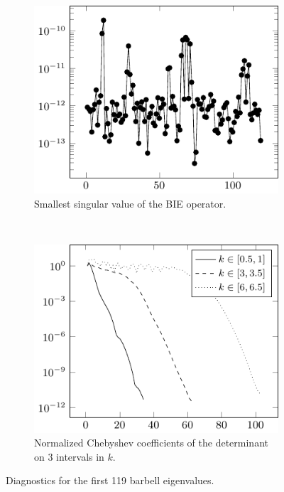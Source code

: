 \begin{figure}
  \centering
  \begin{subfigure}[t]{0.4\textwidth}
    \centering
    \includegraphics[width=\textwidth]{ex_barbell_001_sings_plot}
    \caption{Smallest singular value of the BIE operator.}
    \label{subfig:barbell_sings}
  \end{subfigure}
  ~
  \begin{subfigure}[t]{0.4\textwidth}
    \centering
    \includegraphics[width=\textwidth]{ex_barbell_001_coeffs_plot}
    \caption{Normalized Chebyshev coefficients of the
      determinant on 3 intervals in $k$.}
    \label{subfig:barbell_coeffs}
  \end{subfigure}
  \caption{Diagnostics for the first 119 barbell eigenvalues.}
  \label{fig:barbell_diagnostics}
\end{figure}

